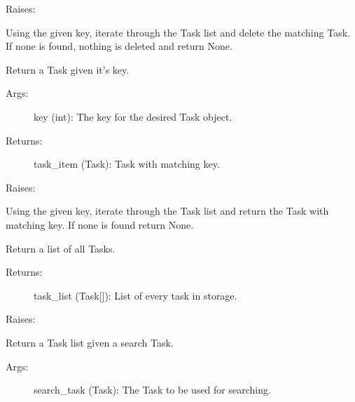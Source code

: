 \documentclass[letterpaper,10pt,english]{sphinxmanual}
\begin{document}
\begin{fulllineitems}
\begin{fulllineitems}
\begin{description}
\end{description}

Raises:

Using the given key, iterate through the Task list and delete the 
matching Task. If none is found, nothing is deleted and return None.

\end{fulllineitems}



\begin{fulllineitems}
\label{index:storage.FileStorage.find}
Return a Task given it's key.
\begin{description}
\item[{Args:}] \leavevmode
key (int): The key for the desired Task object.

\item[{Returns:}] \leavevmode
task\_item (Task): Task with matching key.

\end{description}

Raises:

Using the given key, iterate through the Task list and return the Task
with matching key. If none is found return None.

\end{fulllineitems}



\begin{fulllineitems}
\label{index:storage.FileStorage.get_all}
Return a list of all Tasks.
\begin{description}
\item[{Returns:}] \leavevmode
task\_list (Task{[}{]}): List of every task in storage.

\end{description}

Raises:

\end{fulllineitems}



\begin{fulllineitems}
\label{index:storage.FileStorage.search}
Return a Task list given a search Task.
\begin{description}
\item[{Args:}] \leavevmode
search\_task (Task): The Task to be used for searching.


\end{description}
\end{fulllineitems}
\end{fulllineitems}
\end{document}
